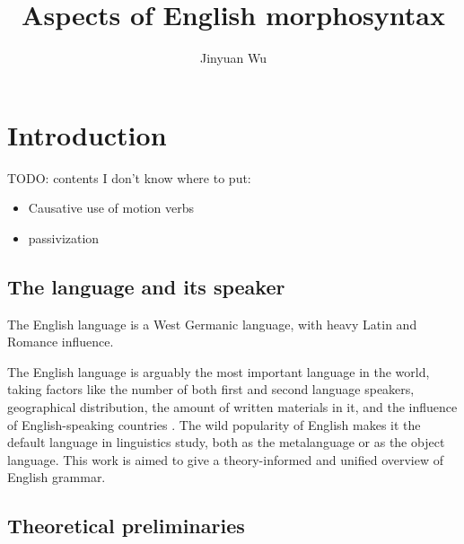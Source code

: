 \documentclass[UTF8, a4paper, oneside, scheme=plain]{ctexrep}
\title{Aspects of English morphosyntax}
\author{Jinyuan Wu}
\newcommand*{\citepage}[1]{pp.~{#1}}
\begin{document}
    
\maketitle

\automath

\tableofcontents

\chapter{Introduction}

\setcounter{page}{1}

TODO: contents I don't know where to put:
\begin{itemize}
    \item Causative use of motion verbs \citep[\citepage{103}]{dixon2005semantic}
    \item passivization
\end{itemize}

\section{The language and its speaker}

The English language is a West Germanic language,
with heavy Latin and Romance influence. 

The English language is arguably the most important language in the world,
taking factors like the number of both first and second language speakers,
geographical distribution,
the amount of written materials in it,
and the influence of English-speaking countries \citep[\citepage{3}]{quirk1985}.
The wild popularity of English 
makes it the default language in linguistics study,
both as the metalanguage or as the object language.
This work is aimed to give a theory-informed and unified overview of English grammar.


\section{Theoretical preliminaries}
\end{document}
